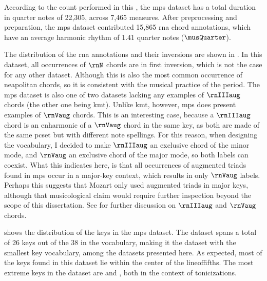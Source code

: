 
According to the count performed in this \thesisdiss{}, the
\gls{mps} dataset has a total duration in quarter notes of
22,305, across 7,465 measures. After preprocessing and
preparation, the \gls{mps} dataset contributed 15,865
\gls{rna} chord annotations, which have an average harmonic
rhythm of 1.41 quarter notes ($\musQuarter$).

The distribution of the \gls{rna} annotations and their
inversions are shown in . In this
dataset, all occurrences of $\rnN$ chords are in first
inversion, which is not the case for any other dataset.
Although this is also the most common occurrence of
\gls{neapolitan} chords, so it is consistent with the
musical practice of the period. The \gls{mps} dataset is
also one of two datasets lacking any examples of $\rnIIIaug$
chords (the other one being \gls{kmt}). Unlike \gls{kmt},
however, \gls{mps} does present examples of $\rnVaug$
chords. This is an interesting case, because a $\rnIIIaug$
chord is an enharmonic of a $\rnVaug$ chord in the same key,
as both are made of the same \gls{pcset} but with different
note spellings. For this reason, when designing the
vocabulary, I decided to make $\rnIIIaug$ an exclusive chord
of the minor mode, and $\rnVaug$ an exclusive chord of the
major mode, so both labels can coexist. What this indicates
here, is that all occurrences of augmented triads found in
\gls{mps} occur in a major-key context, which results in
only $\rnVaug$ labels. Perhaps this suggests that Mozart
only used augmented triads in major keys, although that
musicological claim would require further inspection beyond
the scope of this dissertation. See
 for
further discussion on $\rnIIIaug$ and $\rnVaug$ chords.



 shows the distribution of the keys
in the \gls{mps} dataset. The dataset spans a total of 26
keys out of the 38 in the vocabulary, making it the dataset
with the smallest key vocabulary, among the datasets
presented here. As expected, most of the keys found in this
dataset lie within the center of the \gls{lineoffifths}. The
most extreme keys in the dataset are \keydb{} and \keyFs{},
both in the context of tonicizations.
